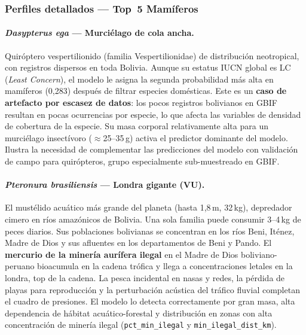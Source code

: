 \documentclass[12pt,a4paper]{article}
\begin{document}
\subsubsection{Perfiles detallados --- Top~5 Mamíferos}

\paragraph{\textit{Dasypterus ega} --- Murciélago de cola ancha.}
Quiróptero vespertilionido (familia Vespertilionidae) de distribución neotropical,
con registros dispersos en toda Bolivia.
Aunque su estatus IUCN global es LC (\textit{Least Concern}),
el modelo le asigna la segunda probabilidad más alta en mamíferos (0,283)
después de filtrar especies domésticas.
Este es un \textbf{caso de artefacto por escasez de datos}: los pocos registros bolivianos
en GBIF resultan en pocas ocurrencias por especie, lo que afecta las variables de
densidad de cobertura de la especie.
Su masa corporal relativamente alta para un murciélago insectívoro ($\approx$25--35\,g)
activa el predictor dominante del modelo.
Ilustra la necesidad de complementar las predicciones del modelo con
validación de campo para quirópteros, grupo especialmente sub-muestreado en GBIF.

\paragraph{\textit{Pteronura brasiliensis} --- Londra gigante (VU).}
El mustélido acuático más grande del planeta (hasta 1,8\,m, 32\,kg),
depredador cimero en ríos amazónicos de Bolivia.
Una sola familia puede consumir 3--4\,kg de peces diarios.
Sus poblaciones bolivianas se concentran en los ríos Beni, Iténez, Madre de Dios y
sus afluentes en los departamentos de Beni y Pando.
El \textbf{mercurio de la minería aurífera ilegal} en el Madre de Dios boliviano-peruano
bioacumula en la cadena trófica y llega a concentraciones letales en la londra,
top de la cadena.
La pesca incidental en nasas y redes, la pérdida de playas para reproducción y
la perturbación acústica del tráfico fluvial completan el cuadro de presiones.
El modelo lo detecta correctamente por gran masa, alta dependencia de hábitat
acuático-forestal y distribución en zonas con alta concentración de minería ilegal
(\texttt{pct\_min\_ilegal} y \texttt{min\_ilegal\_dist\_km}).
\end{document}
